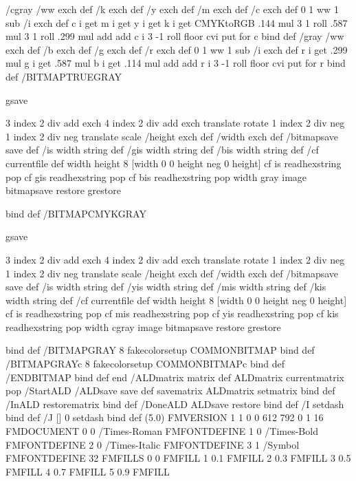 /cgray { 
        /ww exch def
        /k exch def
        /y exch def
        /m exch def
        /c exch def
        0 1 ww 1 sub { /i exch def c i get m i get y i get k i get CMYKtoRGB
				.144 mul 3 1 roll .587 mul 3 1 roll .299 mul add add
				c i 3 -1 roll floor cvi put } for
        c
 		} bind def
/gray { 
        /ww exch def
        /b exch def
        /g exch def
        /r exch def
        0 1 ww 1 sub { /i exch def r i get .299 mul g i get .587 mul
			b i get .114 mul add add r i 3 -1 roll floor cvi put } for
        r
        } bind def
/BITMAPTRUEGRAY { 
        gsave
		
		3 index 2 div add exch	
		4 index 2 div add exch	
		translate		
		rotate			
		1 index 2 div neg	
		1 index 2 div neg	
		translate		
		scale			
		/height exch def /width exch def
        /bitmapsave save def 
        /is width string def
        /gis width string def
        /bis width string def
        /cf currentfile def 
        width height 8 [width 0 0 height neg 0 height] 
        { cf is readhexstring pop 
          cf gis readhexstring pop 
          cf bis readhexstring pop width gray}  image
        bitmapsave restore 
        grestore
        } bind def
/BITMAPCMYKGRAY { 
        gsave
		
		3 index 2 div add exch	
		4 index 2 div add exch	
		translate		
		rotate			
		1 index 2 div neg	
		1 index 2 div neg	
		translate		
		scale			
		/height exch def /width exch def
        /bitmapsave save def 
        /is width string def
        /yis width string def
        /mis width string def
        /kis width string def
        /cf currentfile def 
        width height 8 [width 0 0 height neg 0 height] 
        { cf is readhexstring pop 
          cf mis readhexstring pop 
          cf yis readhexstring pop 
          cf kis readhexstring pop width cgray}  image
        bitmapsave restore 
        grestore
        } bind def
/BITMAPGRAY { 
	8 {fakecolorsetup} COMMONBITMAP
	} bind def
/BITMAPGRAYc { 
	8 {fakecolorsetup} COMMONBITMAPc
	} bind def
/ENDBITMAP {
	} bind def
end 
	/ALDmatrix matrix def ALDmatrix currentmatrix pop
/StartALD {
	/ALDsave save def
	 savematrix
	 ALDmatrix setmatrix
	} bind def
/InALD {
	 restorematrix
	} bind def
/DoneALD {
	 ALDsave restore
	} bind def
/I { setdash } bind def
/J { [] 0 setdash } bind def
(5.0) FMVERSION
1 1 0 0 612 792 0 1 16 FMDOCUMENT
0 0 /Times-Roman FMFONTDEFINE
1 0 /Times-Bold FMFONTDEFINE
2 0 /Times-Italic FMFONTDEFINE
3 1 /Symbol FMFONTDEFINE
32 FMFILLS
0 0 FMFILL
1 0.1 FMFILL
2 0.3 FMFILL
3 0.5 FMFILL
4 0.7 FMFILL
5 0.9 FMFILL
